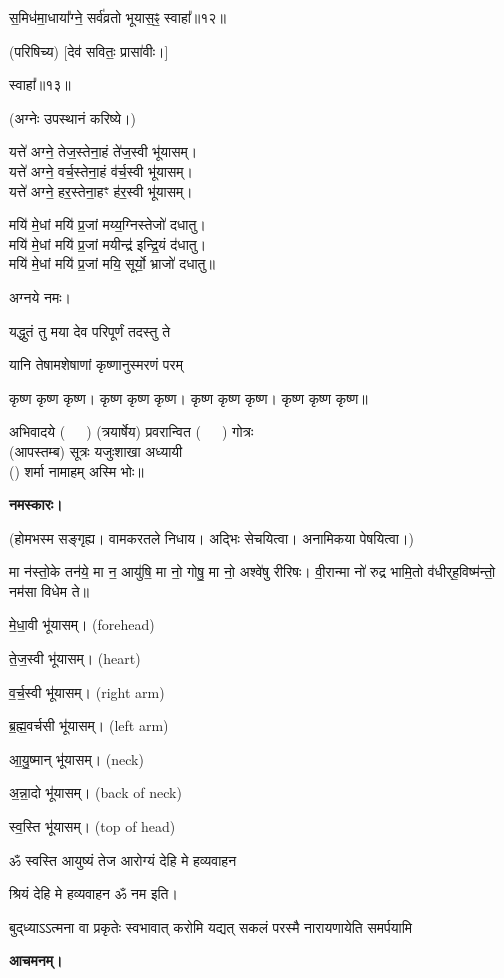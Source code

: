 स॒मिध॑मा॒धाया᳚ग्ने॒ सर्व॑व्रतो भूयास॒ꣴ॒ स्वाहा᳚॥१२॥

(परिषिच्य) [देव॑ सवितः॒ प्रासा॑वीः।]

स्वाहा᳚॥१३॥


(अग्नेः उपस्थानं करिष्ये।)

यत्ते॑ अग्ने॒ तेज॒स्तेना॒हं ते॑ज॒स्वी भू॑यासम्।\\
यत्ते॑ अग्ने॒ वर्च॒स्तेना॒हं व॑र्च॒स्वी भू॑यासम्।\\
यत्ते॑ अग्ने॒ हर॒स्तेना॒हꣳ ह॑र॒स्वी भू॑यासम्।

मयि॑ मे॒धां मयि॑ प्र॒जां मय्य॒ग्निस्तेजो॑ दधातु।\\
मयि॑ मे॒धां मयि॑ प्र॒जां मयीन्द्र॑ इन्द्रि॒यं द॑धातु।\\
मयि॑ मे॒धां मयि॑ प्र॒जां मयि॒ सूर्यो॒ भ्राजो॑ दधातु॥
 
अग्नये नमः। 

{यद्धुतं तु मया देव परिपूर्णं तदस्तु ते}

{यानि तेषामशेषाणां कृष्णानुस्मरणं परम्}

कृष्ण कृष्ण कृष्ण। कृष्ण कृष्ण कृष्ण। कृष्ण कृष्ण कृष्ण। कृष्ण कृष्ण कृष्ण॥

अभिवादये \mbox{(~~~)} (त्रयार्षेय) प्रवरान्वित \mbox{(~~~)} गोत्रः\\
(आपस्तम्ब) सूत्रः यजुःशाखा अध्यायी\\
() शर्मा नामाहम् अस्मि भोः॥

\textbf{नमस्कारः।}



(होमभस्म सङ्गृह्य। वामकरतले निधाय। अद्भिः सेचयित्वा। अनामिकया पेषयित्वा।)

 मा न॑स्तो॒के तन॑ये॒ मा न॒ आयु॑षि॒ मा नो॒ गोषु॒ मा नो॒ अश्वे॑षु रीरिषः। वी॒रान्मा नो॑ रुद्र भामि॒तो व॑धीर्‌ह॒विष्म॑न्तो॒ नम॑सा विधेम ते॥
 
 मे॒धा॒वी भू॑यासम्। (forehead)
 
 ते॒ज॒स्वी भू॑यासम्। (heart)
 
 व॒र्च॒स्वी भू॑यासम्। (right arm)
 
 ब्र॒ह्म॒वर्चसी भू॑यासम्। (left arm)
 
 आ॒यु॒ष्मान् भू॑यासम्। (neck)
 
 अ॒न्ना॒दो भू॑यासम्। (back of neck)
 
 स्व॒स्ति भू॑यासम्। (top of head)
 
ॐ स्वस्ति 
{आयुष्यं तेज आरोग्यं देहि मे हव्यवाहन}
 
श्रियं देहि मे हव्यवाहन ॐ नम इति।

{बुद्‌ध्याऽऽत्मना वा प्रकृतेः स्वभावात्}
{करोमि यद्यत् सकलं परस्मै}
{नारायणायेति समर्पयामि}

\textbf{आचमनम्।}


 
